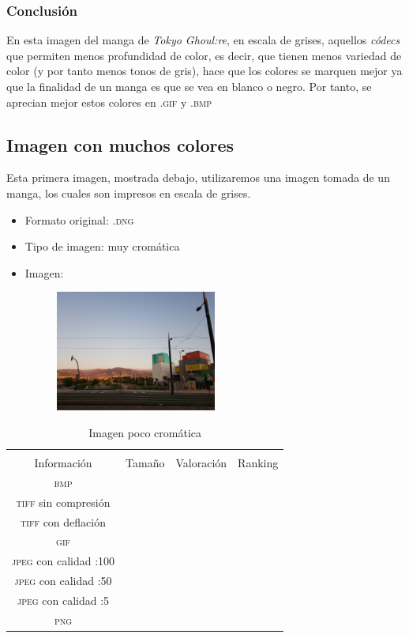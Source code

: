 \documentclass[11pt,a4paper]{article}
\begin{document}
\subsubsection{Conclusión}

En esta imagen del manga de \textit{Tokyo Ghoul:re}, en escala de grises, aquellos \textit{códecs} que permiten menos profundidad de color, es decir, que tienen menos variedad de color (y por tanto menos tonos de gris), hace que los colores se marquen mejor ya que la finalidad de un manga es que se vea en blanco o negro. Por tanto, se aprecian mejor estos colores en \textsc{.gif} y \textsc{.bmp}

\subsection{Imagen con muchos colores}

Esta primera imagen, mostrada debajo, utilizaremos una imagen tomada de un manga, los cuales son impresos en escala de grises.

\begin{itemize}
	\item Formato original: \textsc{.dng}
	\item Tipo de imagen: muy cromática
	\item Imagen:
		\begin{figure}[H]
		\centering
			\includegraphics[width=0.5\textwidth]{Fotos/crom.jpg}
		\end{figure}	
\end{itemize}

\begin{table}[H]
\centering
\begin{tabular}{|c|c|c|c|}
\hline
\diagbox[width=15em]{\textit{Códec}/Formato}{\\Información} & Tamaño & Valoración & Ranking \\
\hline
\textsc{bmp} &  &  &  \\ \hline
\textsc{tiff} sin compresión &  &  &  \\ \hline
\textsc{tiff} con deflación &  &  &  \\ \hline
\textsc{gif} &  &  &  \\ \hline
\textsc{jpeg} con calidad :100 &  &  &  \\ \hline
\textsc{jpeg} con calidad :50 &  &  &  \\ \hline
\textsc{jpeg} con calidad :5 &  &  &  \\ \hline
\textsc{png} &  &  &  \\ \hline
\end{tabular}
\caption{Imagen poco cromática}
\label{tab:my-table}
\end{table}
\end{document}
